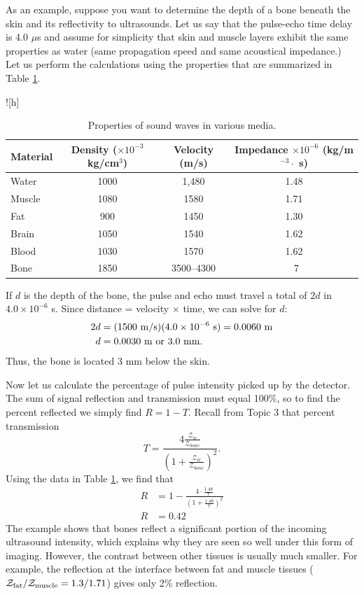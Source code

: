 As an example, suppose you want to determine the depth of a bone beneath the skin and its reflectivity to ultrasounds. Let us say that the pulse-echo time delay is 4.0 $\mu$s and assume for simplicity that skin and muscle layers exhibit the same properties as water (same propagation speed and same acoustical impedance.)  Let us perform the calculations using the properties that are summarized in Table \ref{table10-1}.
\begin{table}![h]
\begin{center}
\begin{tabular}{|l|c|c|c|}
\hline
Material & Density ($\times10^{-3}$kg/cm$^3$) & Velocity (m/s) & Impedance $\times10^{-6}$ (kg/m$^{-3}\cdot$ s) \\
\hline
Water & 1000 & 1,480 & 1.48\\
Muscle & 1080 & 1580 & 1.71\\
Fat & 900 & 1450 & 1.30\\
Brain & 1050 & 1540 & 1.62\\
Blood & 1030 & 1570 & 1.62\\
Bone & 1850 & 3500--4300 & ~7\\
\hline
\end{tabular}
\caption{Properties of sound waves in various media.}
\label{table10-1}
\end{center}
\end{table}
If $d$ is the depth of the bone, the pulse and echo must travel a total of $2d$ in $4.0\times10^{-6}$ s.  Since distance = velocity $\times$ time, we can solve for $d$: 
\begin{align}
2d &= (1500~{\rm m/s})(4.0\times10^{-6}~{\rm s}) = 0.0060~{\rm m}\nonumber\\
d &= 0.0030~{\rm m~or}~3.0~{\rm mm}.\nonumber
\end{align}
Thus, the bone is located 3 mm below the skin.

Now let us calculate the percentage of pulse intensity picked up by the detector.  The sum of signal reflection and transmission must equal 100\%, so to find the percent reflected we simply find $R = 1 -T$.  Recall from Topic 3 that percent transmission
$$T = \frac{4\frac{\mathcal{Z}_w}{\mathcal{Z}_{bone}}}{\left(1+\frac{\mathcal{Z}_w}{\mathcal{Z}_{bone}}\right)^2}.$$
Using the data in Table \ref{table10-1}, we find that
\begin{align}
R &= 1-\frac{4\cdot\frac{1.48}{7}}{\left(1+\frac{1.48}{7}\right)^2}\nonumber\\
R &= 0.42\nonumber
\end{align}
The example shows that bones reflect a significant portion of the incoming ultrasound intensity, which explains why they are seen so well under this form of imaging.  However, the contrast between other tissues is usually much smaller. For example, the reflection at the interface between fat and muscle tissues ($\mathcal{Z}_{\rm fat}/\mathcal{Z}_{\rm muscle} = 1.3/1.71$) gives only 2\% reflection. 


